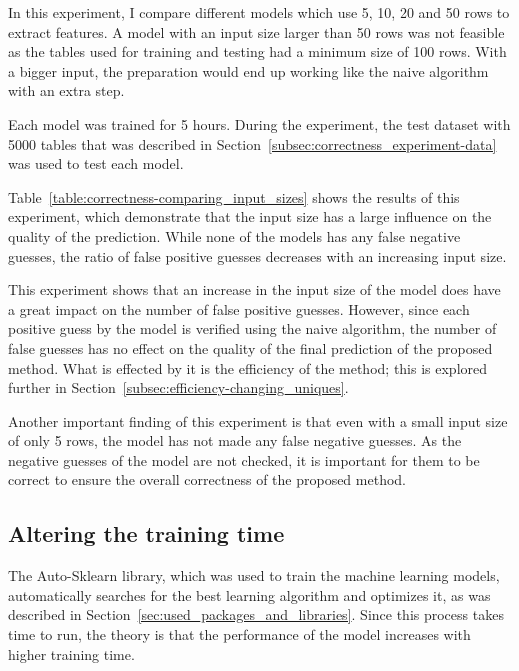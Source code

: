 In this experiment, I compare different models which use \num{5}, \num{10}, \num{20} and \num{50} rows to extract features. A model with an input size larger than \num{50} rows was not feasible as the tables used for training and testing had a minimum size of \num{100} rows. With a bigger input, the preparation would end up working like the naive algorithm with an extra step.


Each model was trained for \num{5} hours. During the experiment, the test dataset with \num{5000} tables that was described in Section~\ref{subsec:correctness_experiment-data} was used to test each model. %

Table~\ref{table:correctness-comparing_input_sizes} shows the results of this experiment, which demonstrate that the input size has a large influence on the quality of the prediction. While none of the models has any false negative guesses, the ratio of false positive guesses decreases with an increasing input size.

This experiment shows that an increase in the input size of the model does have a great impact on the number of false positive guesses. However, since each positive guess by the model is verified using the naive algorithm, the number of false guesses has no effect on the quality of the final prediction of the proposed method. What is effected by it is the efficiency of the method; this is explored further in Section~\ref{subsec:efficiency-changing_uniques}.

Another important finding of this experiment is that even with a small input size of only \num{5} rows, the model has not made any false negative guesses. As the negative guesses of the model are not checked, it is important for them to be correct to ensure the overall correctness of the proposed method.




\subsection{Altering the training time}\label{subsec:correctness_comparing-training-time} %
The Auto-Sklearn library, which was used to train the machine learning models, automatically searches for the best learning algorithm and optimizes it, as was described in Section~\ref{sec:used_packages_and_libraries}. Since this process takes time to run, the theory is that the performance of the model increases with higher training time. %

